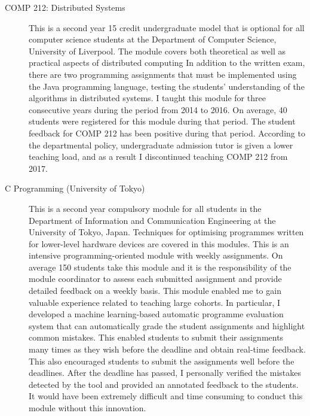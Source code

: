 \documentclass[a4paper,11pt]{article}
\begin{document}
\begin{description}
\item[COMP 212: Distributed Systems]
This is a second year 15 credit undergraduate model that is optional for all computer science students at the Department of Computer Science, University of Liverpool. The module covers both theoretical as well as practical aspects of distributed computing 
In addition to the written exam, there are two programming assignments that must be implemented using the Java programming language, testing the students' understanding of the algorithms in distributed systems.
I taught this module for three consecutive years during the period from 2014 to 2016.
On average, 40 students were registered for this module during that period. The student feedback for COMP 212 has been positive during that period. 
According to the departmental policy, undergraduate admission tutor is given a lower teaching load, and as a result I discontinued teaching COMP 212 from 2017.

\item[C Programming (University of Tokyo)]
This is a second year compulsory module for all students in the Department of Information and Communication Engineering at the University of Tokyo, Japan. Techniques for optimising programmes written for lower-level hardware devices are covered in this modules.
This is an intensive programming-oriented module with weekly assignments. On average 150 students take this module and it is the responsibility of the module coordinator to assess each submitted assignment and provide detailed feedback on a weekly basis. 
This module enabled me to gain valuable experience related to teaching large cohorts. 
In particular, I developed a machine learning-based automatic programme evaluation system that can automatically grade the student assignments and highlight common mistakes. This enabled students to submit their assignments many times as they wish before the deadline and obtain real-time feedback. This also encouraged students to submit the assignments well before the deadlines.
After the deadline has passed, I personally verified the mistakes detected by the tool and provided an annotated feedback to the students.
It would have been extremely difficult and time consuming to conduct this module without this innovation.




\end{description}
\end{document}
